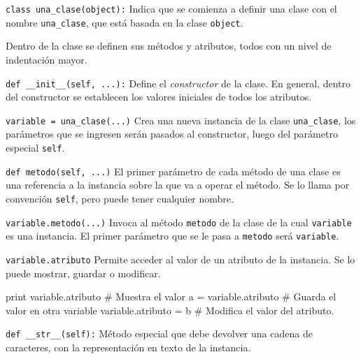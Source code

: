 \begin{referencia_python}

\begin{sintaxis}{\lstinline!class una_clase(object):!}
Indica que se comienza a definir una clase con el nombre
\lstinline!una_clase!, que está basada en la clase \lstinline!object!.

Dentro de la clase se definen sus métodos y atributos, todos con un
nivel de indentación mayor.
\end{sintaxis}

\begin{sintaxis}{\lstinline!def __init__(self, ...):!}
Define el {\it constructor} de la clase.  En general, dentro del
constructor se establecen los valores iniciales de todos los
atributos.
\end{sintaxis}

\begin{sintaxis}{\lstinline!variable = una_clase(...)!}
Crea una nueva instancia de la clase \lstinline!una_clase!, los
parámetros que se ingresen serán pasados al constructor, luego del
parámetro especial \lstinline!self!.
\end{sintaxis}

\begin{sintaxis}{\lstinline!def metodo(self, ...)!}
El primer parámetro de cada método de una clase es una referencia a la
instancia sobre la que va a operar el método.  Se lo llama por
convención \lstinline!self!, pero puede tener cualquier nombre.
\end{sintaxis}

\begin{sintaxis}{\lstinline!variable.metodo(...)!}
Invoca al método \lstinline!metodo! de la clase de la cual
\lstinline!variable! es una instancia.  El primer parámetro que se le
pasa a \lstinline!metodo! será \lstinline!variable!.
\end{sintaxis}

\begin{sintaxis}{\lstinline!variable.atributo!}
Permite acceder al valor de un atributo de la instancia.  Se lo puede
mostrar, guardar o modificar.
\begin{codigo-python-sn}
print variable.atributo # Muestra el valor
a = variable.atributo   # Guarda el valor en otra variable
variable.atributo = b   # Modifica el valor del atributo.
\end{codigo-python-sn}
\end{sintaxis}

\begin{sintaxis}{\lstinline!def __str__(self):!}
Método especial que debe devolver una cadena de caracteres, con
la representación en texto de la instancia.
\end{sintaxis}


\end{referencia_python}
